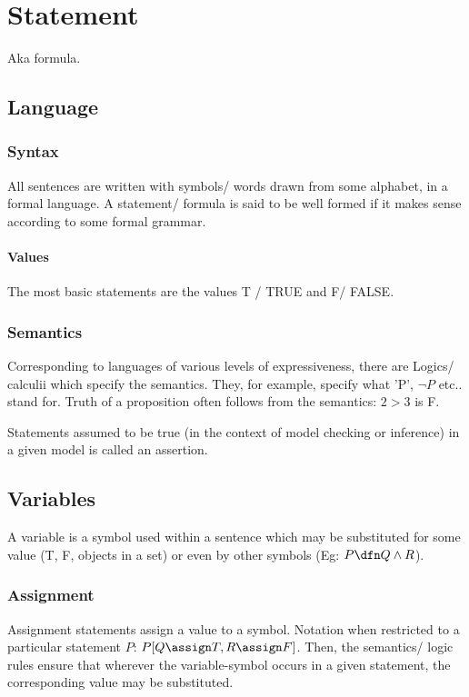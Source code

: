 \documentclass[oneside, article]{memoir}
\begin{document}
\chapter{Statement}
Aka formula.

\section{Language}
\subsection{Syntax}
All sentences are written with symbols/ words drawn from some alphabet, in a formal language. A statement/ formula is said to be well formed if it makes sense according to some formal grammar.

\subsubsection{Values}
The most basic statements are the values T / TRUE and F/ FALSE.

\subsection{Semantics}
Corresponding to languages of various levels of expressiveness, there are Logics/ calculii which specify the semantics. They, for example, specify what 'P', $\lnot P$ etc.. stand for. Truth of a proposition often follows from the semantics: $2>3$ is F.

Statements assumed to be true (in the context of model checking or inference) in a given model is called an assertion.


\section{Variables}
A variable is a symbol used within a sentence which may be substituted for some value (T, F, objects in a set) or even by other symbols (Eg: $P \dfn Q \land R$).

\subsection{Assignment}
Assignment statements assign a value to a symbol. Notation when restricted to a particular statement $P$: $P[Q \assign T, R \assign F]$. Then, the semantics/ logic rules ensure that wherever the variable-symbol occurs in a given statement, the corresponding value may be substituted.
\end{document}
